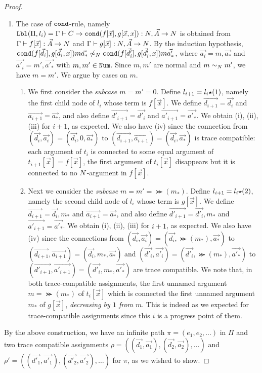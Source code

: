 \begin{proof}
\begin{enumerate}
  \item  
    The case of ${\tt cond}$-rule, namely
    ${\tt Lbl}(\Pi,l_i) = \Gamma\vdash C\rightarrow {\tt cond}(f[\vec{x}],g[\vec{x},x]):{N},\vec{A}\rightarrow{N}$
    is obtained from 
    $\Gamma\vdash f[\vec{x}]:\vec{A}\rightarrow{N}$
    and
    $\Gamma\vdash g[\vec{x}]:{N},\vec{A}\rightarrow{N}$. 
    By the induction hypothesis, ${\tt cond}(f[\vec{d_i}],g[\vec{d_i},x])m\vec{a_*} \not\sim_{N} {\tt cond}(f[\vec{d'_i}],g[\vec{d'_i},x])m\vec{a'_*}$, 
    where $\vec{a_i} = m,\vec{a_*}$ and $\vec{a'_i} = m',\vec{a'_*}$ with $m,m' \in {\tt Num}$.
    Since $m,m'$ are normal and $m \sim_{N} m'$, we have $m = m'$. 
    We argue by cases on $m$.
    \begin{enumerate}
    \item
      We first consider the \emph{subcase $m=m'=0$}.
      Define $l_{i+1}=l_i{\star}(1)$, namely the first child node of $l_i$ whose term is $f[\vec{x}]$. 
      We define $\vec{d_{i+1}} = \vec{d_i}$ and $\vec{a_{i+1}} = \vec{a_*}$,
      and also define $\vec{d'_{i+1}} = \vec{d'_i}$ and $\vec{a'_{i+1}} = \vec{a'_*}$. 
      We obtain (i), (ii), (iii) for $i+1$, as expected. 
      We also have (iv) since the connection from 
      $(\vec{d_i},\vec{a_i}) =(\vec{d_i},0,\vec{a_*})$ to
      $(\vec{d_{i+1}},\vec{a_{i+1}}) = (\vec{d_i},\vec{a_*})$ is trace compatible: 
      each argument of $t_i$ is connected to some equal argument of $t_{i+1}[\vec{x}]=f[\vec{x}]$,
      the first argument of $t_i[\vec{x}]$ disappears but it is connected to no ${N}$-argument in $f[\vec{x}]$.
    \item
      Next we consider the \emph{subcase $m=m'=\Succ(m_*)$}. 
      Define $l_{i+1}=l_i{\star}(2)$, namely the second child node of $l_i$ whose term is $g[\vec{x}]$. 
      We define $\vec{d_{i+1}} = \vec{d_i},m_*$ and $\vec{a_{i+1}} = \vec{a_*}$,
      and also define $\vec{d'_{i+1}} = \vec{d'_i},m_*$ and $\vec{a'_{i+1}} = \vec{a'_*}$. 
      We obtain (i), (ii), (iii) for $i+1$, as expected.
      We also have (iv) since the connections from 
      $(\vec{d_i},\vec{a_i}) =(\vec{d_i},\Succ(m_*),\vec{a_*})$ to $(\vec{d_{i+1}},\vec{a_{i+1}}) = (\vec{d_i},m_*,\vec{a_*})$
      and
      $(\vec{d'_i},\vec{a'_i}) =(\vec{d'_i},\Succ(m_*),\vec{a'_*})$ to $(\vec{d'_{i+1}},\vec{a'_{i+1}}) = (\vec{d'_i},m_*,\vec{a'_*})$      
      are trace compatible.
      We note that, in both trace-compatible assignments, the first unnamed argument $m = \Succ(m_*)$ of $t_i[\vec{x}]$ 
      which is connected the first unnamed argument $m_*$ of $g[\vec{x}]$, \emph{decreasing by $1$ from $m$}.
      This is indeed as we expected for trace-compatible assignments since this $i$ is a progress point of them. 
    \end{enumerate}
  \end{enumerate}
  
  By the above construction, we have an infinite path $\pi=(e_1,e_2,\ldots)$ in $\Pi$ and
  two trace compatible assignments
  $\rho = ((\vec{d_1},\vec{a_1}),(\vec{d_2},\vec{a_2}),\ldots)$
  and
  $\rho' = ((\vec{d'_1},\vec{a'_1}),(\vec{d'_2},\vec{a'_2}),\ldots)$ for $\pi$,
  as we wished to show. 
  
\end{proof}

